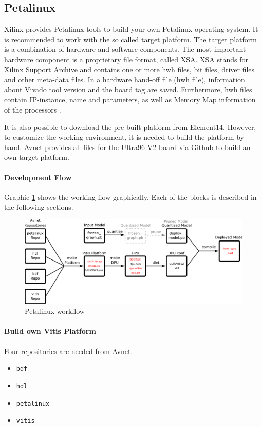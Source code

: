 \subsection{Petalinux}
\label{subsec:embedded_platform:operating_systems:petalinux}

Xilinx provides Petalinux tools to build your own Petalinux operating system.
It is recommended to work with the so called target platform.
The target platform is a combination of hardware and software components.
The most important hardware component is a proprietary file format, called XSA.
XSA stands for Xilinx Support Archive and contains one or more hwh files, bit files, driver files and other meta-data files.
In a hardware hand-off file (hwh file), information about Vivado tool version and the board tag are saved.
Furthermore, hwh files contain IP-instance, name and parameters, as well as Memory Map information of the processors \cite{vitis_user_guide}.

It is also possible to download the pre-built platform from Element14.
However, to customize the working environment, it is needed to build the platform by hand.
Avnet provides all files for the Ultra96-V2 board via Github to build an own target platform.

\paragraph{Development Flow}
Graphic \ref{fig:petalinux_workflow} shows the working flow graphically.
Each of the blocks is described in the following sections.

\begin{figure}[h]
	\centering
	\includegraphics[width=1\textwidth]{graphics/workflow.pdf}
	\caption{Petalinux workflow}
	\label{fig:petalinux_workflow}
\end{figure}

\paragraph{Build own Vitis Platform}
Four repositories are needed from Avnet.
\begin{itemize}
	\item \texttt{bdf}
	\item \texttt{hdl}
	\item \texttt{petalinux}
	\item \texttt{vitis}
\end{itemize}

